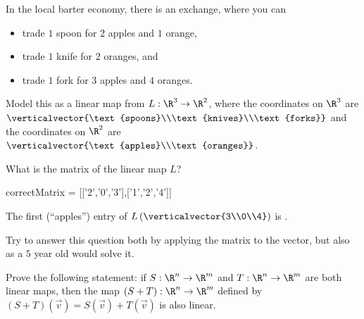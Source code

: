 \documentclass{ximera}
\begin{document}
\begin{question}
  In the local barter economy, there is an exchange, where you can 
  \begin{itemize}
  \item trade $1$ spoon for $2$ apples and $1$ orange,
  \item trade $1$ knife for $2$ oranges, and
  \item trade $1$ fork for $3$ apples and $4$ oranges.
  \end{itemize}
  Model this as a linear map from $L:\R^3 \to \R^2$, where the coordinates on $\R^3$ are $\verticalvector{\text{spoons}\\\text{knives}\\\text{forks}}$ and the coordinates on $\R^2$ are
  $\verticalvector{\text{apples}\\\text{oranges}}$.

  \begin{solution}
    What is the matrix of the linear map $L$?

    \begin{matrix-answer}[name=w]
      correctMatrix = [['2','0','3'],['1','2','4']]
    \end{matrix-answer}              
  \end{solution}

  \begin{solution}
    The first (``apples'') entry of $L\left(\verticalvector{3\\0\\4}\right)$ is .

    Try to answer this question both by applying the matrix to the
    vector, but also as a $5$ year old would solve it.
  \end{solution}
\end{question} 

\begin{question}
  Prove the following statement: if $S:\R^n \to\R^m$ and $T:\R^n \to \R^m$ are both linear maps, 
  then the map $(S+T):\R^n \to\R^m$ defined by $(S+T)(\vec{v}) = S(\vec{v})+T(\vec{v})$ is also linear.

  \begin{free-response}
  \end{free-response}
\end{question}

\end{document}
